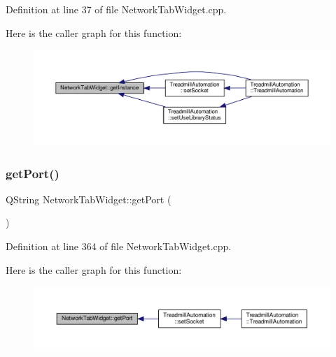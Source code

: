 Definition at line 37 of file Network\+Tab\+Widget.\+cpp.

Here is the caller graph for this function\+:
\nopagebreak
\begin{figure}[H]
\begin{center}
\leavevmode
\includegraphics[width=350pt]{class_network_tab_widget_a350dbedf09f3c1fb5bbcba75cc282eb8_icgraph}
\end{center}
\end{figure}
\mbox{\label{class_network_tab_widget_a6bca5b733737261fc4ee402324623e5b}} 
\subsubsection{\texorpdfstring{get\+Port()}{getPort()}}
{\footnotesize\ttfamily Q\+String Network\+Tab\+Widget\+::get\+Port (\begin{DoxyParamCaption}{ }\end{DoxyParamCaption})}



Definition at line 364 of file Network\+Tab\+Widget.\+cpp.

Here is the caller graph for this function\+:
\nopagebreak
\begin{figure}[H]
\begin{center}
\leavevmode
\includegraphics[width=350pt]{class_network_tab_widget_a6bca5b733737261fc4ee402324623e5b_icgraph}
\end{center}
\end{figure}
\mbox{\label{class_network_tab_widget_ae12d4be4ad527d3b9fc0708b9dea6d3d}} 
